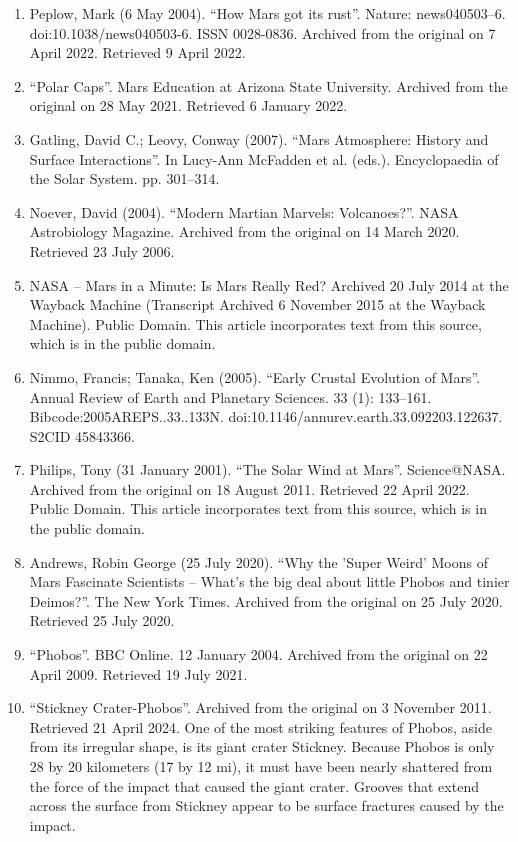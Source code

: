 \begin{enumerate}
\item Peplow, Mark (6 May 2004). ``How Mars got its rust''. Nature: news040503–6. doi:10.1038/news040503-6. ISSN 0028-0836. Archived from the original on 7 April 2022. Retrieved 9 April 2022.
\item ``Polar Caps''. Mars Education at Arizona State University. Archived from the original on 28 May 2021. Retrieved 6 January 2022.
\item Gatling, David C.; Leovy, Conway (2007). ``Mars Atmosphere: History and Surface Interactions''. In Lucy-Ann McFadden et al. (eds.). Encyclopaedia of the Solar System. pp. 301–314.
\item Noever, David (2004). ``Modern Martian Marvels: Volcanoes?''. NASA Astrobiology Magazine. Archived from the original on 14 March 2020. Retrieved 23 July 2006.
\item NASA – Mars in a Minute: Is Mars Really Red? Archived 20 July 2014 at the Wayback Machine (Transcript Archived 6 November 2015 at the Wayback Machine). Public Domain. This article incorporates text from this source, which is in the public domain.
\item Nimmo, Francis; Tanaka, Ken (2005). ``Early Crustal Evolution of Mars''. Annual Review of Earth and Planetary Sciences. 33 (1): 133–161. Bibcode:2005AREPS..33..133N. doi:10.1146/annurev.earth.33.092203.122637. S2CID 45843366.
\item Philips, Tony (31 January 2001). ``The Solar Wind at Mars''. Science@NASA. Archived from the original on 18 August 2011. Retrieved 22 April 2022. Public Domain. This article incorporates text from this source, which is in the public domain.
\item Andrews, Robin George (25 July 2020). ``Why the 'Super Weird' Moons of Mars Fascinate Scientists – What's the big deal about little Phobos and tinier Deimos?''. The New York Times. Archived from the original on 25 July 2020. Retrieved 25 July 2020.
\item ``Phobos''. BBC Online. 12 January 2004. Archived from the original on 22 April 2009. Retrieved 19 July 2021.
\item ``Stickney Crater-Phobos''. Archived from the original on 3 November 2011. Retrieved 21 April 2024. One of the most striking features of Phobos, aside from its irregular shape, is its giant crater Stickney. Because Phobos is only 28 by 20 kilometers (17 by 12 mi), it must have been nearly shattered from the force of the impact that caused the giant crater. Grooves that extend across the surface from Stickney appear to be surface fractures caused by the impact.

\end{enumerate}

